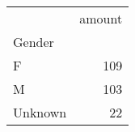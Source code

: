 \begin{tabular}{lr}
\toprule
{} &  amount \\
Gender  &         \\
\midrule
F       &     109 \\
M       &     103 \\
Unknown &      22 \\
\bottomrule
\end{tabular}
